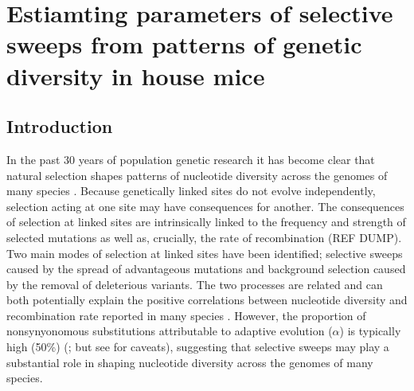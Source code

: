\chapter{Estiamting parameters of selective sweeps from patterns of genetic diversity in house mice}



%
%


\section{Introduction}

In the past 30 years of population genetic research it has become clear that natural selection shapes patterns of nucleotide diversity across the genomes of many species \citep{RN154, RN117}. Because genetically linked sites do not evolve independently, selection acting at one site may have consequences for another. The consequences of selection at linked sites are intrinsically linked to the frequency and strength of selected mutations as well as, crucially, the rate of recombination (REF DUMP). Two main modes of selection at linked sites have been identified; selective sweeps caused by the spread of advantageous mutations and background selection caused by the removal of deleterious variants. The two processes are related and can both potentially explain the positive correlations between nucleotide diversity and recombination rate reported in many species \citep{RN117}. However, the proportion of nonsynyonomous substitutions attributable to adaptive evolution ($\alpha$) is typically high (50\%) (\citealt{RN215}; but see \citealt{RN352} for caveats), suggesting that selective sweeps may play a substantial role in shaping nucleotide diversity across the genomes of many species.


